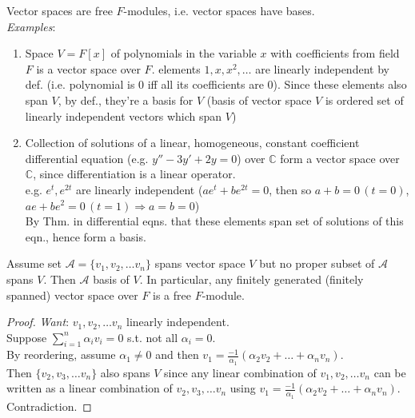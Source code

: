 Vector spaces are free $F$-modules, i.e. vector spaces have bases.  \\

\emph{Examples}:

\begin{enumerate}
	\item Space $V= F[x]$ of polynomials in the variable $x$ with coefficients from field $F$ is a vector space over $F$. elements $1,x,x^2, \dots $ are linearly independent by def. (i.e. polynomial is $0$ iff all its coefficients are $0$). Since these elements also span $V$, by def., they're a basis for $V$ (basis of vector space $V$ is ordered set of linearly independent vectors which span $V$)
	\item Collection of solutions of a linear, homogeneous, constant coefficient differential equation (e.g. $y'' - 3y' + 2y = 0$) over $\mathbb{C}$ form a vector space over $\mathbb{C}$, since differentiation is a linear operator. \\
 	e.g. $e^t, e^{2t}$ are linearly independent ($ae^t + be^{2t} =0$, then so $a+b =0 \, (t=0)$, $ae + be^2 = 0 \, (t=1) \Longrightarrow a=b=0$) \\
 	By Thm. in differential eqns. that these elements span set of solutions of this eqn., hence form a basis.
\end{enumerate}

\begin{proposition}
	Assume set $\mathcal{A} = \lbrace v_1, v_2 , \dots v_n \rbrace$ spans vector space $V$ but no proper subset of $\mathcal{A}$ spans $V$. Then $\mathcal{A}$ basis of $V$. In particular, any finitely generated (finitely spanned) vector space over $F$ is a free $F$-module.
\end{proposition}

\begin{proof}
\emph{Want}: $v_1, v_2, \dots v_n$ linearly independent. \\

Suppose $\sum_{i=1}^n \alpha_i v_i = 0$ s.t. not all $\alpha_i = 0$. \\

By reordering, assume $\alpha_1 \neq 0$ and then $v_1 = \frac{-1}{\alpha_1} (\alpha_2 v_2 + \dots + \alpha_n v_n)$. \\
Then $\lbrace v_2, v_3, \dots v_n \rbrace$ also spans $V$ since any linear combination of $v_1, v_2, \dots v_n$ can be written as a linear combination of $v_2, v_3, \dots v_n$ using $v_1 = \frac{-1}{\alpha_1} (\alpha_2 v_2 + \dots + \alpha_n v_n)$. Contradiction.	
	
\end{proof}


